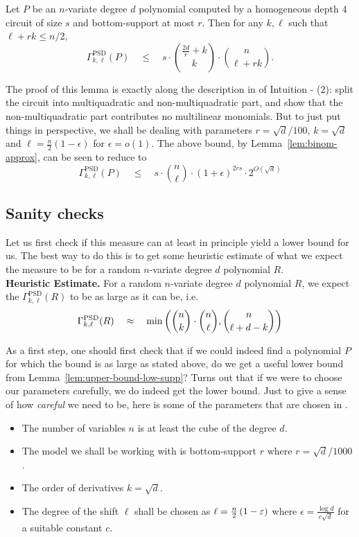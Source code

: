 \begin{lemma}\label{lem:upper-bound-low-supp}
Let $P$ be an $n$-variate degree $d$ polynomial computed by a homogeneous depth $4$ circuit of size $s$ and bottom-support at most $r$. Then for any $k,\ell$ such that $\ell + rk \leq n/2$, 
\[
\Gamma^{\mathrm{PSD}}_{k,\ell}(P) \quad \leq \quad s \cdot \binom{\frac{2d}{r}+k}{k}\cdot \binom{n}{\ell+rk}. 
\]
\end{lemma}

The proof of this lemma is exactly along the description in of Intuition - (2): split the circuit into multiquadratic and non-multiquadratic part, and show that the non-multiquadratic part contributes no multilinear monomials. But to just put things in perspective, we shall be dealing with parameters $r = \sqrt{d}/100$, $k = \sqrt{d}$ and $\ell = \frac{n}{2}(1 - \epsilon)$ for $\epsilon = o(1)$. The above bound, by Lemma~\ref{lem:binom-approx}, can be seen to reduce to
\[
\Gamma^{\mathrm{PSD}}_{k,\ell}(P) \quad \leq \quad s \cdot \binom{n}{\ell} \cdot (1+\epsilon)^{2rs} \cdot 2^{O(\sqrt{d})}
\]


\subsection*{Sanity checks}

Let us first check if this measure can at least in principle yield a lower bound for us. The best way to do this is to get some heuristic estimate of what we expect the measure to be for a random $n$-variate degree $d$ polynomial $R$. \\

{\bf Heuristic Estimate. } For a random $n$-variate degree $d$ polynomial $R$, we expect the $\Gamma^{\mathrm{PSD}}_{k,\ell}(R)$ to be as large as it can be, i.e.
\[
\Gamma^{\mathrm{PSD}}_{k,\ell}(R) \quad \approx \quad \min\left(\binom{n}{k}\cdot \binom{n}{\ell}, \binom{n}{\ell + d-k}\right)
\]

As a first step, one should first check that if we could indeed find a polynomial $P$ for which the bound is as large as stated above, do we get a useful lower bound from Lemma~\ref{lem:upper-bound-low-supp}? Turns out that if we were to choose our parameters carefully, we do indeed get the lower bound. Just to give a sense of how \emph{careful} we need to be, here is some of the parameters that are chosen in \cite{KLSS,KS14}. 

\begin{itemize}
\item The number of variables $n$ is at least the cube of the degree $d$. 
\item The model we shall be working with is bottom-support $r$ where $r = \sqrt{d}/1000$. 
\item The order of derivatives $k = \sqrt{d}$. 
\item The degree of the shift $\ell$ shall be chosen as $\ell = \frac{n}{2}\left(1 - \varepsilon\right)$ where $\epsilon = \frac{\log d}{c\sqrt{d}}$ for a suitable constant $c$. 
\end{itemize}

